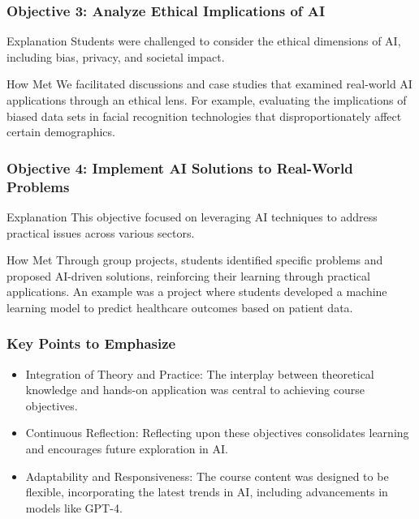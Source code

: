 \documentclass[aspectratio=169]{beamer}
\begin{document}
\begin{frame}[fragile]
    \frametitle{Objective 3: Analyze Ethical Implications of AI}
    \begin{block}{Explanation}
        Students were challenged to consider the ethical dimensions of AI, including bias, privacy, and societal impact.
    \end{block}
    \begin{block}{How Met}
        We facilitated discussions and case studies that examined real-world AI applications through an ethical lens. 
        For example, evaluating the implications of biased data sets in facial recognition technologies that disproportionately affect certain demographics.
    \end{block}
\end{frame}

\begin{frame}[fragile]
    \frametitle{Objective 4: Implement AI Solutions to Real-World Problems}
    \begin{block}{Explanation}
        This objective focused on leveraging AI techniques to address practical issues across various sectors.
    \end{block}
    \begin{block}{How Met}
        Through group projects, students identified specific problems and proposed AI-driven solutions, reinforcing their learning through practical applications. 
        An example was a project where students developed a machine learning model to predict healthcare outcomes based on patient data.
    \end{block}
\end{frame}

\begin{frame}[fragile]
    \frametitle{Key Points to Emphasize}
    \begin{itemize}
        \item Integration of Theory and Practice: The interplay between theoretical knowledge and hands-on application was central to achieving course objectives.
        \item Continuous Reflection: Reflecting upon these objectives consolidates learning and encourages future exploration in AI.
        \item Adaptability and Responsiveness: The course content was designed to be flexible, incorporating the latest trends in AI, including advancements in models like GPT-4.
    \end{itemize}
\end{frame}
\end{document}
